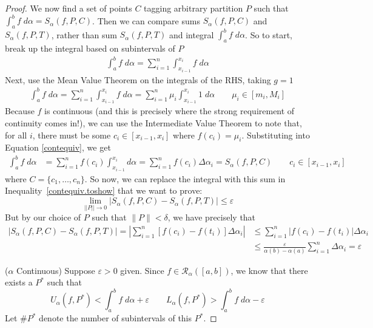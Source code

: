 \documentclass[12pt]{article}
\numberwithin{equation}{section} %
\theoremstyle{plain}
\theoremstyle{definition}
\theoremstyle{remark}
\begin{document}
\begin{proof}
We now find a set of points $C$ tagging arbitrary partition $P$
such that $\int^b_a f\;d\alpha = S_\alpha(f,P,C)$. Then we can compare
sums $S_\alpha(f,P,C)$ and $S_\alpha(f,P,T)$, rather
than sum $S_\alpha(f,P,T)$ and integral $\int^b_af\;d\alpha$.  So to
start, break up the integral based on subintervals of $P$
\begin{align*}
  \int^b_a f \; d\alpha
  =
  \sum_{i=1}^n \int^{x_i}_{x_{i-1}} f\;d\alpha
\end{align*}
Next, use the Mean Value Theorem on the integrals of the RHS, taking
$g=1$
\begin{align}
  \int^b_a f \; d\alpha
  =
  \sum_{i=1}^n \int^{x_i}_{x_{i-1}} f\;d\alpha
  =
  \sum_{i=1}^n \mu_i\int^{x_i}_{x_{i-1}} 1\;d\alpha
  \qquad \mu_i \in [m_i,M_i]
  \label{contequiv}
\end{align}
Because $f$ is continuous (and this is precisely where the strong
requirement of continuity comes in!),
we can use the Intermediate Value Theorem to note that, for all $i$,
there must be some $c_i \in [x_{i-1}, x_i]$ where $f(c_i) = \mu_i$.
Substituting into Equation \ref{contequiv}, we get
\begin{align*}
  \int^b_a f \; d\alpha
    &= \sum^n_{i=1} f(c_i) \int^{x_i}_{x_{i-1}} d\alpha
    = \sum^n_{i=1} f(c_i) \Delta\alpha_i
    = S_\alpha(f,P,C)
    \qquad
    c_i \in [x_{i-1}, x_{i}]
\end{align*}
where $C=\{c_1,\ldots,c_n\}$.
So now, we can replace the integral with this sum in
Inequality~\ref{contequiv.toshow} that we want to prove:
\begin{equation}
    \label{contequiv.toshow2}
    \lim_{||P||\rightarrow 0}
    \left\lvert  S_\alpha(f,P,C)- S_\alpha(f,P,T) \right\rvert
        \leq \varepsilon
\end{equation}
But by our choice of $P$ such that $\lVert P\rVert<\delta$, we have
precisely that
\begin{align*}
    \left\lvert  S_\alpha(f,P,C)- S_\alpha(f,P,T) \right\rvert
    = \left\lvert  \sum^n_{i=1} \left[f(c_i) - f(t_i) \right]
    \Delta\alpha_i\right\rvert
    &\leq \sum^n_{i=1} \left\lvert  f(c_i) - f(t_i) \right\rvert
    \Delta\alpha_i  \\
    &\leq \frac{\varepsilon}{\alpha(b)-\alpha(a)}
        \sum^n_{i=1} \Delta\alpha_i =  \varepsilon
\end{align*}
\clearpage

($\alpha$ Continuous)
Suppose $\varepsilon>0$ given.  Since $f\in\mathscr{R}_\alpha([a,b])$,
we know that there exists a $P^*$ such that
\begin{equation}
    \label{bases}
    U_\alpha(f,P^*) < \int^b_a f\;d\alpha + \varepsilon
        \qquad L_\alpha(f,P^*) > \int^b_a f\;d\alpha - \varepsilon
\end{equation}
Let $\#P^*$ denote the number of subintervals of this $P^*$.


\end{proof}
\end{document}
